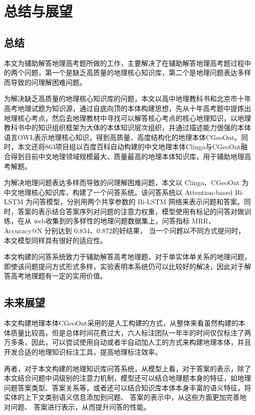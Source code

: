 \chapter{总结与展望}
\section{总结}
本文为辅助解答地理高考题所做的工作，主要解决了在辅助解答地理高考题过程中的两个问题，第一个是缺乏高质量的地理核心知识库，第二个是地理问题表达多样而导致的问理解困难问题。

为解决缺乏高质量的地理核心知识库的问题，本文以高中地理教科书和北京市十年高考地理试题为知识源，通过自底向顶的本体构建思想，先从十年高考题中提炼出地理核心考点，然后去地理教材中寻找可以解答核心考点的核心地理知识，以地理教科书中的知识组织框架为大体的本体知识层次组织，并通过描述能力很强的本体语言OWL表示地理核心知识，得到高质量、高度结构化的地理本体CGeoOnt。同时，本文还将863项目组以百度百科自动构建的中文地理本体Clinga与CGeoOnt融合得到目前中文地理领域规模最大、质量最高的地理本体知识库，用于辅助地理高考解题。

为解决地理问题表达多样而导致的问理解困难问题，本文以 Clinga、CGeoOnt 为中文地理核心知识库，构建了一个问答系统。该问答系统以 Attention-based Bi-LSTM 为问答模型，分别用两个共享参数的 Bi-LSTM 网络来表示问题和答案。同时，答案的表示结合答案序列对问题的注意力权重，模型使用有标记的问答对做训练，在从 web收集到的多样性的地理问题数据集上，问答指标 MRR、Accuracy@N 分别达到 0.834、0.872的好结果， 当一个问题以不同方式提问时，本文模型同样具有很好的适应性。

本文构建的问答系统致力于辅助解答高考地理题，对于单实体单关系的地理问题，即使该问题提问方式形式多样，实验表明本系统仍可以比较好的解决，因此对于解答高考地理题有一定的实用价值。

\section{未来展望}
本文构建地理本体CGeoOnt采用的是人工构建的方式，从整体来看虽然构建的本体质量比较高，但是总体时间花费过大，六人标注团队一年半的时间仅仅标注了两万多条，因此，可以尝试使用自动或者半自动加人工的方式来构建地理本体，并且开发合适的地理知识标注工具，提高地理标注效率。

再者，对于本文构建的地理知识库问答系统，从模型上看，对于答案的表示，除了本文结合问题中词级别的注意力机制，模型还可以结合地理题本身的特征，如地理问题答案类型、答案关系等，或者还可以结合知识库本体本身丰富的语义特征，将实体的上下文类别语义信息添加到问题、 答案的表示中，从这些方面更加完善地对问题、 答案进行表示，从而提升问答的性能。


